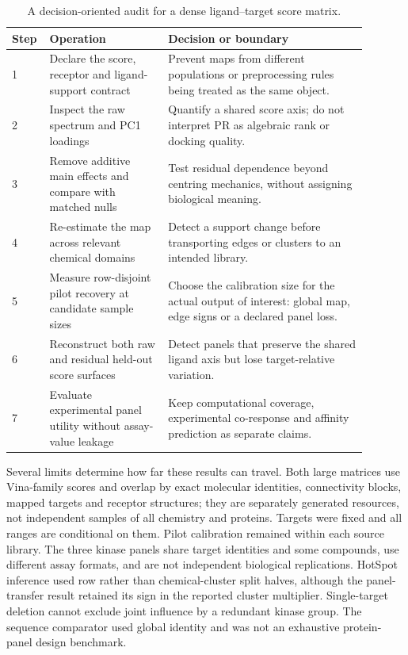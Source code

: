 \documentclass[11pt]{article}
\begin{document}
\begin{table}[htbp]
\centering
\caption{A decision-oriented audit for a dense ligand--target score matrix.}
\label{tab:audit}
\small
\begin{tabular}{p{0.06\linewidth}p{0.31\linewidth}p{0.52\linewidth}}
\toprule
Step & Operation & Decision or boundary \\
\midrule
1 & Declare the score, receptor and ligand-support contract & Prevent maps from
different populations or preprocessing rules being treated as the same object. \\
2 & Inspect the raw spectrum and PC1 loadings & Quantify a shared score axis;
do not interpret PR as algebraic rank or docking quality. \\
3 & Remove additive main effects and compare with matched nulls & Test residual
dependence beyond centring mechanics, without assigning biological meaning. \\
4 & Re-estimate the map across relevant chemical domains & Detect a support
change before transporting edges or clusters to an intended library. \\
5 & Measure row-disjoint pilot recovery at candidate sample sizes & Choose the
calibration size for the actual output of interest: global map, edge signs or a
declared panel loss. \\
6 & Reconstruct both raw and residual held-out score surfaces & Detect panels
that preserve the shared ligand axis but lose target-relative variation. \\
7 & Evaluate experimental panel utility without assay-value leakage & Keep
computational coverage, experimental co-response and affinity prediction as
separate claims. \\
\bottomrule
\end{tabular}
\end{table}

Several limits determine how far these results can travel. Both large matrices
use Vina-family scores and overlap by \SharedExactLigands{} exact molecular
identities, \SharedConnectivityBlocks{} connectivity blocks,
\SharedTargetIdentities{} mapped targets and \SharedReceptorStructures{}
receptor structures; they are separately generated resources, not independent
samples of all chemistry and proteins. Targets were fixed and all ranges are
conditional on them. Pilot calibration remained within each source library.
The three kinase panels share target identities and some compounds, use
different assay formats, and are not independent biological replications.
HotSpot inference used row rather than chemical-cluster split halves, although
the panel-transfer result retained its sign in the reported cluster multiplier.
Single-target deletion cannot exclude joint influence by a redundant kinase
group.
The sequence comparator used global identity and was not an exhaustive
protein-panel design benchmark.
\end{document}
